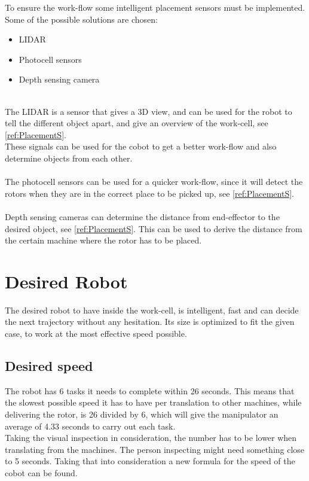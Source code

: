 To ensure the work-flow some intelligent placement sensors must be implemented. Some of the possible solutions are chosen:\\

\begin{itemize}
    \item LIDAR
    \item Photocell sensors
    \item Depth sensing camera
\end{itemize}
\\
The LIDAR is a sensor that gives a 3D view, and can be used for the robot to tell the different object apart, and give an overview of the work-cell, see \ref{ref:PlacementS}.\\
These signals can be used for the cobot to get a better work-flow and also determine objects from each other.\\
\\
The photocell sensors can be used for a quicker work-flow, since it will detect the rotors when they are in the correct place to be picked up, see \ref{ref:PlacementS}.\\
\\
Depth sensing cameras can determine the distance from end-effector to the desired object, see \ref{ref:PlacementS}. This can be used to derive the distance from the certain machine where the rotor has to be placed.\cu

\section{Desired Robot}\label{IdealRobot}

The desired robot to have inside the work-cell, is intelligent, fast and can decide the next trajectory without any hesitation. Its size is optimized to fit the given case, to work at the most effective speed possible.\\

\subsection{Desired speed}

The robot has 6 tasks it needs to complete within 26 seconds. This means that the slowest possible speed it has to have per translation to other machines, while delivering the rotor, is 26 divided by 6, which will give the manipulator an average of 4.33 seconds to carry out each task.\\
Taking the visual inspection in consideration, the number has to be lower when translating from the machines. The person inspecting might need something close to 5 seconds. Taking that into consideration a new formula for the speed of the cobot can be found.\\

